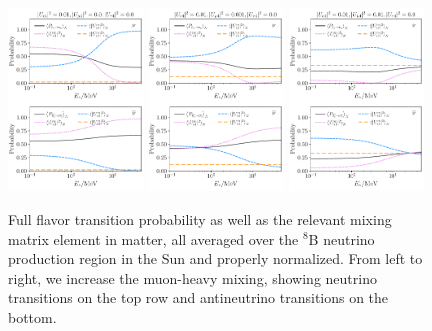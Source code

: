 \documentclass[
reprint,
superscriptaddress,
showpacs,
preprintnumbers,
nofootinbib,
nobibnotes,
amsmath,
amssymb, 
aps,
prd,
floatfix
]{revtex4-1}
\begin{document}
\begin{figure}[t]
    \centering
    \includegraphics[width=0.32\textwidth]{Psolar_usqr_001_0_0.pdf}
    \includegraphics[width=0.32\textwidth]{Psolar_usqr_001_0001_0.pdf}
    \includegraphics[width=0.32\textwidth]{Psolar_usqr_001_001_0.pdf}
    \caption{Full flavor transition probability as well as the relevant mixing matrix element in matter, all averaged over the $^8$B neutrino production region in the Sun and properly normalized. From left to right, we increase the muon-heavy mixing, showing neutrino transitions on the top row and antineutrino transitions on the bottom.}
    \label{fig:probability}
\end{figure}
\end{document}
